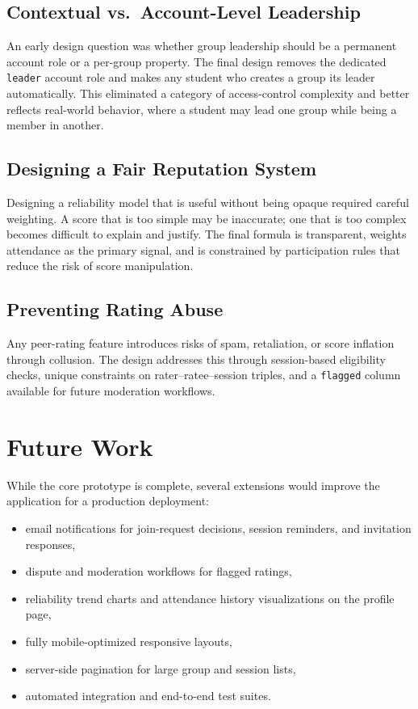 \documentclass[conference]{IEEEtran}
\begin{document}
\subsection{Contextual vs.\ Account-Level Leadership}
An early design question was whether group leadership should be a permanent account role or a per-group property. The final design removes the dedicated \texttt{leader} account role and makes any student who creates a group its leader automatically. This eliminated a category of access-control complexity and better reflects real-world behavior, where a student may lead one group while being a member in another.

\subsection{Designing a Fair Reputation System}
Designing a reliability model that is useful without being opaque required careful weighting. A score that is too simple may be inaccurate; one that is too complex becomes difficult to explain and justify. The final formula is transparent, weights attendance as the primary signal, and is constrained by participation rules that reduce the risk of score manipulation.

\subsection{Preventing Rating Abuse}
Any peer-rating feature introduces risks of spam, retaliation, or score inflation through collusion. The design addresses this through session-based eligibility checks, unique constraints on rater--ratee--session triples, and a \texttt{flagged} column available for future moderation workflows.

\section{Future Work}
While the core prototype is complete, several extensions would improve the application for a production deployment:
\begin{itemize}
    \item email notifications for join-request decisions, session reminders, and invitation responses,
    \item dispute and moderation workflows for flagged ratings,
    \item reliability trend charts and attendance history visualizations on the profile page,
    \item fully mobile-optimized responsive layouts,
    \item server-side pagination for large group and session lists,
    \item automated integration and end-to-end test suites.
\end{itemize}
\end{document}

